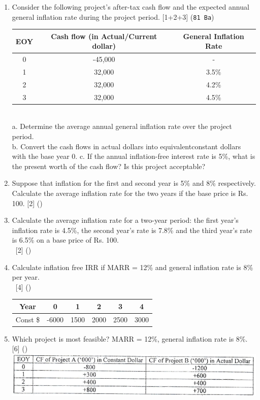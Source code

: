 \documentclass[12pt]{article}
\newcommand{\enter}{\\\textcolor{white}{1}}
\begin{document}
\begin{enumerate}
			\item Consider the following project's after-tax cash flow and the expected annual general inflation rate during the project period. \hfill [1+2+3] (\texttt{81 Ba})\\
			\begin{tabular}{|c|c|c|}
				\hline
				EOY & Cash flow (in Actual/Current dollar) & General Inflation Rate \\ \hline
				0 & -45,000 & - \\ \hline
				1 & 32,000 & 3.5\% \\ \hline
				2 & 32,000 & 4.2\% \\ \hline
				3 & 32,000 & 4.5\% \\ \hline
			\end{tabular}\\
			a. Determine the average annual general inflation rate over the project period.\\
			b. Convert the cash flows in actual dollars into equivalentconstant dollars with the base year 0.
			c. If the annual inflation-free interest rate is 5\%, what is the present worth of the cash flow? Is this project acceptable?

			\item Suppose that inflation for the first and second year is 5\% and 8\% respectively. Calculate the average inflation rate for the two years if the base price is Rs. 100. \hfill [2] ()

			\item Calculate the average inflation rate for a two-year period: the first year's inflation rate is 4.5\%, the second year's rate is 7.8\% and the third year's rate is 6.5\% on a base price of Rs. 100.
			\enter\hfill [2] ()

			\item Calculate inflation free IRR if MARR = 12\% and general inflation rate is 8\% per year.
			\enter\hfill [4] ()\\
			\begin{tabular}{|c|c|c|c|c|c|}
				\hline
				Year & 0 & 1 & 2 & 3 & 4 \\ \hline
				Const \$ & -6000 & 1500 & 2000 & 2500 & 3000 \\ \hline
			\end{tabular}

			\item Which project is most feasible? MARR = 12\%, general inflation rate is 8\%. \hfill [6] ()
			\includegraphics[width=6in]{./pics/ee_2}


\end{enumerate}
\end{document}
